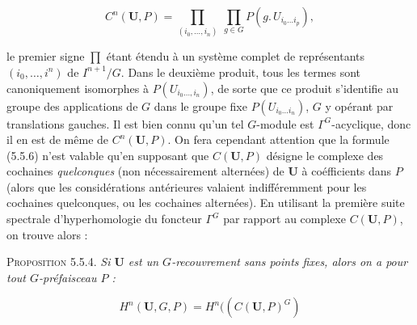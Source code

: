 \[
\tag{5.5.6}
C^n({\mathbf U},P)=
\prod_{(i_0,\ldots,i_n)}\ \prod_{g\in G}
P(g.\, U_{i_0\ldots i_p}),
\]

le premier signe $\displaystyle\prod$ étant étendu à un système complet de représentants
$(i_0,\ldots,i^n)$ de $I^{n+1}/G$. Dans le deuxième produit, tous les termes
sont canoniquement isomorphes à $P(U_{i_0\ldots,i_n})$, de sorte que ce produit
s'identifie au groupe des applications de $G$ dans le groupe fixe
$P(U_{i_0\ldots i_n})$, $G$ y opérant par translations gauches. Il est bien
connu qu'un tel $G$-module est $\Gamma^G$-acyclique, donc il en est de même de
$C^n({\mathbf U},P)$. On fera cependant attention que la formule (5.5.6) n'est
valable qu'en supposant que $C({\mathbf U},P)$ désigne le complexe des cochaines
\emph{quelconques} (non nécessairement alternées) de ${\mathbf U}$ à coéfficients dans
$P$ (alors que les considérations antérieures valaient indifféremment pour les
cochaines quelconques, ou les cochaines alternées). En utilisant la première
suite spectrale d'hyperhomologie du foncteur $\Gamma^G$ par rapport au complexe
$C({\mathbf U},P)$, on trouve alors :

\textsc{Proposition 5.5.4.} \textit{Si ${\mathbf U}$ est un
$G$-recouvrement sans points fixes, alors on a pour tout $G$-préfaisceau $P$ :}

\[
\tag{5.5.7}
H^n({\mathbf U},G,P)=H^n((C({\mathbf U},P)^G)
\]

